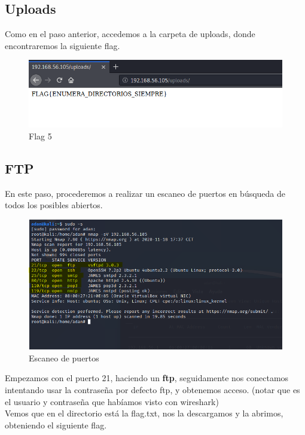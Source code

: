 \documentclass[12pt,twoside]{article}
\begin{document}
\newpage
\subsection{Uploads}
Como en el paso anterior, accedemos a la carpeta de uploads, donde encontraremos la siguiente flag.

\begin{figure}[h]
    \centering
    \includegraphics[scale=0.5]{./imagenes/enumera_directorios_flag}
    \caption{Flag 5}
\end{figure}

\subsection{FTP}
En este paso, procederemos a realizar un escaneo de puertos en búsqueda de todos los posibles abiertos.

\begin{figure}[h]
    \centering
   \includegraphics[scale=0.4]{./imagenes/escaneo_puertos}
    \caption{Escaneo de puertos}
\end{figure}

Empezamos con el puerto 21, haciendo un \textbf{ftp}, seguidamente nos conectamos intentando usar la contraseña por defecto ftp, y obtenemos acceso. (notar que es el usuario y contraseña que habíamos visto con wireshark) \\
Vemos que en el directorio está la flag.txt, nos la descargamos y la abrimos, obteniendo el siguiente flag.
\end{document}
